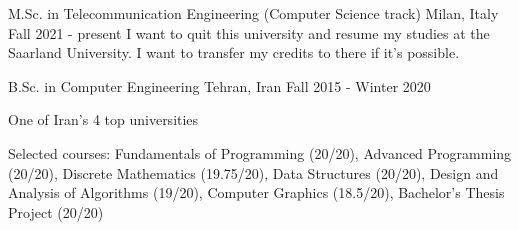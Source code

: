 

\begin{cventries}


  \cventry
    {M.Sc. in Telecommunication Engineering (Computer Science track)} %
    {} %
    {Milan, Italy} %
    {Fall 2021 - present} %
    {
    	I want to quit this university and resume my studies at the Saarland University. I want to transfer my credits to there if it's possible.
    }

  \cventry
    {B.Sc. in Computer Engineering} %
    {} %
    {Tehran, Iran} %
    {Fall 2015 - Winter 2020} %
    {
      \begin{cvitems} %
      \item {
      	One of Iran's 4 top universities
      }
        \item {Selected courses: Fundamentals of Programming (20/20), Advanced Programming (20/20), Discrete Mathematics (19.75/20), \newline Data Structures (20/20), Design and Analysis of Algorithms (19/20), Computer Graphics (18.5/20), Bachelor's Thesis Project (20/20)}
      \end{cvitems}
    }


\end{cventries}
